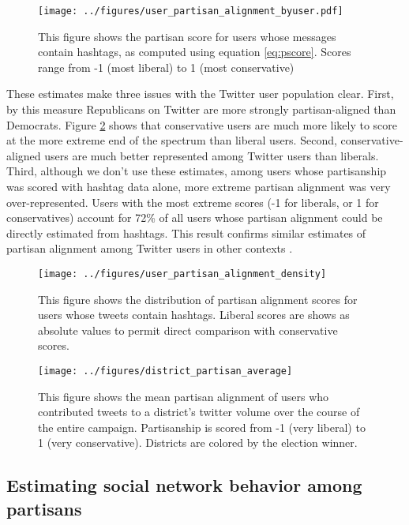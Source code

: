 \documentclass[11pt]{article}
\begin{document}
\begin{figure}[ht]
  \centering
  \texttt{[image: ../figures/user\_partisan\_alignment\_byuser.pdf]}
  \caption{This figure shows the partisan score for users whose
    messages contain hashtags, as computed using equation
    \ref{eq:pscore}. Scores range from -1 (most liberal) to 1 (most conservative)}
  \label{fig:user-pscore}
\end{figure}

These estimates make three issues with the Twitter user population
clear. First, by this measure Republicans on Twitter are more strongly
partisan-aligned than Democrats. Figure
\ref{fig:user-pscore-distribution} shows that conservative users are
much more likely to score at the more extreme end of the spectrum than
liberal users. Second, conservative-aligned users are much better
represented among Twitter users than liberals. Third, although we
don't use these estimates, among users whose partisanship was scored
with hashtag data alone, more extreme partisan alignment was very
over-represented. Users with the most extreme scores (-1 for liberals,
or 1 for conservatives) account for 72\% of all users whose partisan
alignment could be directly estimated from hashtags. This result
confirms similar estimates of partisan alignment among Twitter users
in other contexts \citep{golbeck2011computing}.

\begin{figure}[ht]
  \centering
  \texttt{[image: ../figures/user\_partisan\_alignment\_density]}
  \caption{This figure shows the distribution of partisan alignment
    scores for users whose tweets contain hashtags. Liberal scores are shows as absolute values to permit direct comparison with conservative scores. }
  \label{fig:user-pscore-distribution}
\end{figure}

\begin{figure}[ht]
  \centering
  \texttt{[image: ../figures/district\_partisan\_average]}
  \caption{This figure shows the mean partisan alignment of users who contributed tweets to a district's twitter volume over the course of the entire campaign. Partisanship is scored from -1 (very liberal) to 1 (very conservative). Districts are colored by the election winner.}
  \label{fig:user-partisanship}
\end{figure}

\subsection{Estimating social network behavior among partisans}
\label{sec:soci-netw-behav}
\end{document}
